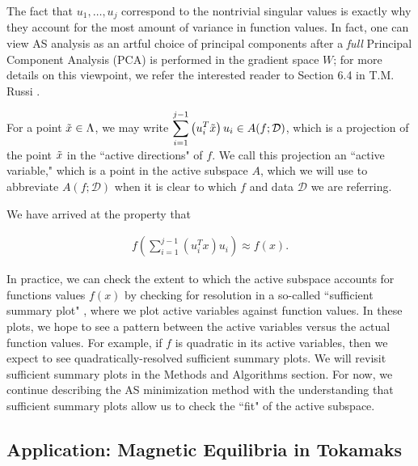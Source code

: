 \documentclass{amsart}
\newcommand{\ds}{\displaystyle}
\begin{document}
\vspace{.25cm}

\noindent The fact that $u_1,\ldots,u_{j}$ correspond to the nontrivial singular values is exactly why they account for the most amount of variance in function values. In fact, one can view AS analysis as an artful choice of principal components after a \textit{full} Principal Component Analysis (PCA) is performed in the gradient space $W$; for more details on this viewpoint, we refer the interested reader to Section 6.4 in T.M. Russi \cite{Russi}.

\vspace{.25cm}

\noindent For a point $\Tilde{x} \in \Lambda$, we may write $\ds \sum_{i=1}^{j-1}\left( u_i^T \Tilde{x}\right)u_i \in A(f;\mathcal{D})$, which is a projection of the point $\Tilde{x}$ in the ``active directions" of $f$. We call this projection an ``active variable," which is a point in the active subspace $A$, which we will use to abbreviate $A(f;\mathcal{D})$ when it is clear to which $f$ and data $\mathcal{D}$ we are referring.

\vspace{.25cm}

We have arrived at the property that 

\begin{eqnarray}
f\left(\sum_{i=1}^{j-1} \left(u_i^T x\right) u_i\right) \approx f(x).
\end{eqnarray} 

In practice, we can check the extent to which the active subspace accounts for functions values $f(x)$ by checking for resolution in a so-called ``sufficient summary plot" \cite{Constantine}, where we plot active variables against function values. In these plots, we hope to see a pattern between the active variables versus the actual function values. For example, if $f$ is quadratic in its active variables, then we expect to see quadratically-resolved sufficient summary plots. We will revisit sufficient summary plots in the Methods and Algorithms section. For now, we continue describing the AS minimization method with the understanding that sufficient summary plots allow us to check the ``fit" of the active subspace.

\subsection{Application: Magnetic Equilibria in Tokamaks}
\end{document}
